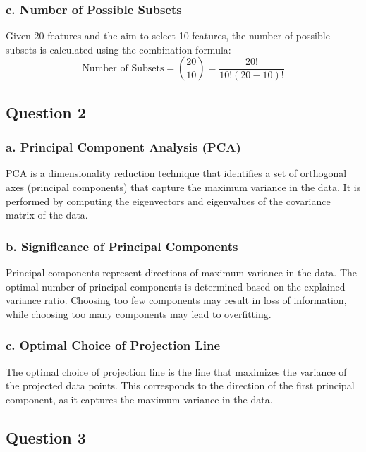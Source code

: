 \documentclass{article}
\begin{document}
\subsubsection*{c. Number of Possible Subsets}

Given 20 features and the aim to select 10 features, the number of possible subsets is calculated using the combination formula:
\[ \text{Number of Subsets} = \binom{20}{10} = \frac{20!}{10!(20-10)!} \]

\subsection*{Question 2}

\subsubsection*{a. Principal Component Analysis (PCA)}

PCA is a dimensionality reduction technique that identifies a set of orthogonal axes (principal components) that capture the maximum variance in the data. It is performed by computing the eigenvectors and eigenvalues of the covariance matrix of the data.

\subsubsection*{b. Significance of Principal Components}

Principal components represent directions of maximum variance in the data. The optimal number of principal components is determined based on the explained variance ratio. Choosing too few components may result in loss of information, while choosing too many components may lead to overfitting.

\subsubsection*{c. Optimal Choice of Projection Line}

The optimal choice of projection line is the line that maximizes the variance of the projected data points. This corresponds to the direction of the first principal component, as it captures the maximum variance in the data.

\subsection*{Question 3}
\end{document}
